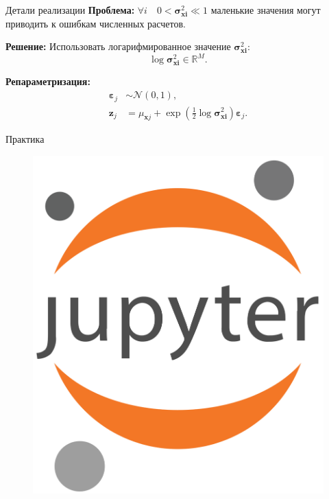 \begin{frame}{Детали реализации}
    \textbf{Проблема:} $\forall i \quad 0 < \boldsymbol{\sigma}_{\boldsymbol{xi}}^2 \ll 1$ \textemdash{} маленькие значения могут приводить к ошибкам численных расчетов.

    \textbf{Решение:} Использовать логарифмированное значение $\boldsymbol{\sigma}_{\boldsymbol{xi}}^2$:
    \begin{equation*}
        \log \boldsymbol{\sigma}_{\boldsymbol{xi}}^2  \in \mathbb{R}^M.
    \end{equation*}

    \textbf{Репараметризация:}
    \begin{align*}
        \boldsymbol{\varepsilon}_j &\sim \boldsymbol{\mathcal{N}}(0, 1), \\
        \boldsymbol{z}_j &= \mu_{\boldsymbol{x}j} + \exp\left(\frac{1}{2}\log \boldsymbol{\sigma}_{\boldsymbol{xi}}^2 \right)\boldsymbol{\varepsilon}_j.
    \end{align*}
\end{frame}

\begin{frame}{Практика}
    \begin{figure}
        \centering
        \includegraphics[width=.3\textwidth]{../resources/overall/Jupyter_logo.png}
    \end{figure}
\end{frame}

